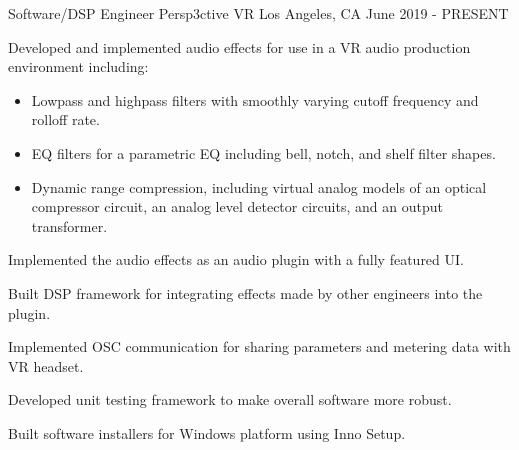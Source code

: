 

\begin{cventries}

    \cventry
    {Software/DSP Engineer} %
    {Persp3ctive VR} %
    {Los Angeles, CA} %
    {June 2019 - PRESENT} %
    {
      \begin{cvitems} %
        \item {Developed and implemented audio effects for use in a VR audio production environment including:}
        \begin{itemize}
            \item {Lowpass and highpass filters with smoothly varying cutoff frequency and rolloff rate.}
            \item {EQ filters for a parametric EQ including bell, notch, and shelf filter shapes.}
            \item {Dynamic range compression, including virtual analog models of
                   an optical compressor circuit, an analog level detector circuits,
                   and an output transformer.}
        \end{itemize}
        \item {Implemented the audio effects as an audio plugin with a fully featured UI.}
        \item {Built DSP framework for integrating effects made by other engineers into the plugin.}
        \item {Implemented OSC communication for sharing parameters and metering data with VR headset.}
        \item {Developed unit testing framework to make overall software more robust.}
        \item {Built software installers for Windows platform using Inno Setup.}
      \end{cvitems}
    }


\end{cventries}
